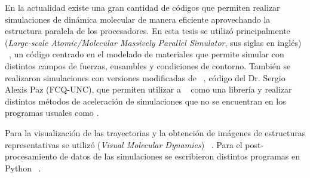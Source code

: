 En la actualidad existe una gran cantidad de códigos que permiten realizar 
simulaciones de dinámica molecular de manera eficiente aprovechando la estructura
paralela de los procesadores. En esta tesis se utilizó principalmente  
(\textit{Large-scale Atomic/Molecular Massively Parallel Simulator}, sus siglas
en inglés) ~\cite{lammps1, lammps2}, un código centrado en el modelado de 
materiales que permite simular con distintos campos de fuerzas, ensambles y 
condiciones de contorno. También se realizaron simulaciones con versiones 
modificadas de  ~\cite{gems}, código del Dr. Sergio Alexis Paz 
(FCQ-UNC), que permiten utilizar a  ~\cite{dftb+} como una librería
y realizar distintos métodos de aceleración de simulaciones que no se encuentran
en los programas usuales como .

Para la visualización de las trayectorias y la obtención de imágenes de 
estructuras representativas se utilizó  (\textit{Visual Molecular 
Dynamics}) ~\cite{vmd}. Para el post-procesamiento de datos de las simulaciones
se escribieron distintos programas en Python ~\cite{exma, sierras}.
